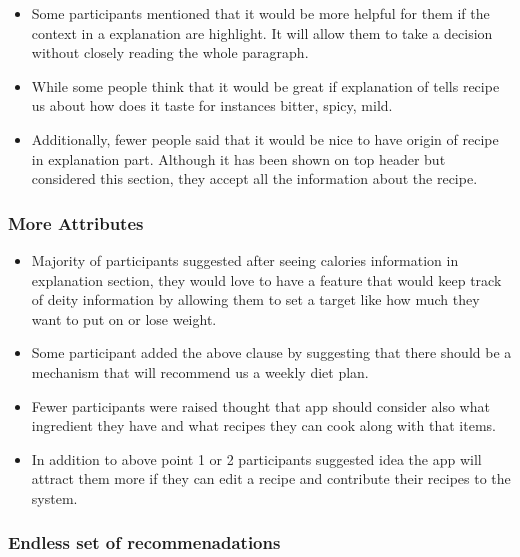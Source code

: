  	\begin{itemize}
 		\item Some participants mentioned that it would be more helpful for them if the context in a explanation are highlight. It will allow them to take a decision without closely reading the whole paragraph.
 		
 		\item  While some people think that it would be great if explanation of tells recipe us about how does it taste for instances bitter, spicy, mild. 
 		
 		 \item Additionally, fewer people said that it would be nice to have origin of recipe in explanation part. Although it has been shown on top header but considered this section, they accept all the information about the recipe. 
 	\end{itemize}
 	
\subsubsection{More Attributes}

	\begin{itemize}
		\item Majority of participants suggested after seeing calories information in explanation section, they would love to have a feature that would keep track of deity information by allowing them to set a target like how much they want to put on or lose weight.
		 
		 \item Some participant added the above clause by suggesting that there should be a mechanism that will recommend us a weekly diet plan.
		 
		 \item Fewer participants were raised thought that app should consider also what ingredient they have and what recipes they can cook along with that items. 

		\item In addition to above point 1 or 2 participants suggested idea the app will attract them more if they can edit a recipe and contribute their recipes to the system. 

	\end{itemize}

\subsubsection{Endless set of recommenadations}

